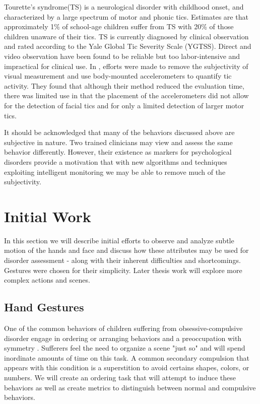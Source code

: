 \documentclass[11pt]{article}
\begin{document}
Tourette's syndrome(TS) is a neurological disorder with childhood onset, and characterized by a large spectrum of motor and phonic tics. Estimates are that approximately 1\% of school-age children suffer from TS with 20\% of those children unaware of their tics. TS is currently diagnosed by clinical observation and rated according to the Yale Global Tic Severity Scale (YGTSS). Direct and video observation have been found to be reliable \cite{walkup1992} but too labor-intensive and impractical for clinical use. In \cite{bernabei2010}, efforts were made to remove the subjectivity of visual measurement and use  body-mounted accelerometers to quantify tic activity. They found that although their method reduced the evaluation time, there was limited use in that the placement of the accelerometers did not allow for the detection of facial tics and for only a limited detection of larger motor tics.

It should be acknowledged that many of the behaviors discussed above are subjective in nature. Two trained clinicians may view and assess the same behavior differently. However, their existence as markers for psychological disorders provide a motivation that with new algorithms and techniques exploiting intelligent monitoring we may be able to remove much of the subjectivity.

\section{Initial Work}
In this section we will describe initial efforts to observe and analyze subtle motion of the hands and face and discuss how these attributes may be used for disorder assessment - along with their inherent difficulties and shortcomings. Gestures were chosen for their simplicity. Later thesis work will explore more complex actions and scenes.
\subsection{Hand Gestures}
One of the common behaviors of children suffering from obsessive-compulsive disorder engage in ordering or arranging behaviors and a preoccupation with symmetry \cite{radomsky2004}. Sufferers feel the need to organize a scene "just so" and will spend inordinate amounts of time on this task. A common secondary compulsion that appears with this condition is a superstition to avoid certains shapes, colors, or numbers. We will create an ordering task that will attempt to induce these behaviors as well as create metrics to distinguish between normal and compulsive behaviors.
\end{document}
